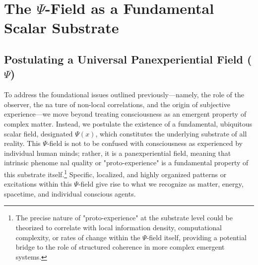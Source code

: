 \documentclass{report}
\begin{document}
\section{The $\Psi$-Field as a Fundamental Scalar Substrate}
\label{sec:psi_field_substrate}
    \subsection{Postulating a Universal Panexperiential Field ($\Psi$)}
    \label{subsec:panexperiential_psi}
    To address the foundational issues outlined previously—namely, the role of the observer, the na ture of non-local correlations, and the origin of subjective experience—we move beyond treating
    consciousness as an emergent property of complex matter. Instead, we postulate the existence
    of a fundamental, ubiquitous scalar field, designated $\Psi(x)$, which constitutes the underlying
    substrate of all reality. This $\Psi$-field is not to be confused with consciousness as experienced by
    individual human minds; rather, it is a panexperiential field, meaning that intrinsic phenome nal quality or "proto-experience" is a fundamental property of this substrate itself.\footnote{The precise nature of "proto-experience" at the substrate level could be theorized to correlate with local information density, computational complexity, or rates of change within the $\Psi$-field itself, providing a potential bridge to the role of structured coherence in more complex emergent systems.} Specific,
    localized, and highly organized patterns or excitations within this $\Psi$-field give rise to what we
    recognize as matter, energy, spacetime, and individual conscious agents.
\end{document}
